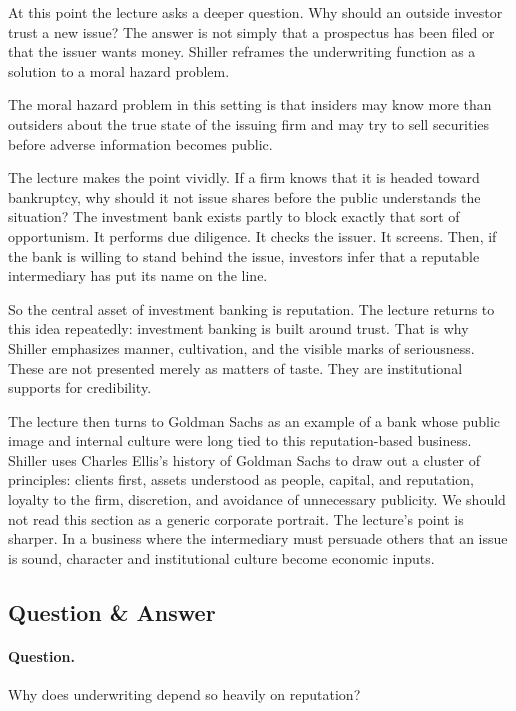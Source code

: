 At this point the lecture asks a deeper question. Why should an outside investor trust a new issue? The answer is not simply that a prospectus has been filed or that the issuer wants money. Shiller reframes the underwriting function as a solution to a moral hazard problem.

\begin{definition}
The moral hazard problem in this setting is that insiders may know more than outsiders about the true state of the issuing firm and may try to sell securities before adverse information becomes public.
\end{definition}

The lecture makes the point vividly. If a firm knows that it is headed toward bankruptcy, why should it not issue shares before the public understands the situation? The investment bank exists partly to block exactly that sort of opportunism. It performs due diligence. It checks the issuer. It screens. Then, if the bank is willing to stand behind the issue, investors infer that a reputable intermediary has put its name on the line.

So the central asset of investment banking is reputation. The lecture returns to this idea repeatedly: investment banking is built around trust. That is why Shiller emphasizes manner, cultivation, and the visible marks of seriousness. These are not presented merely as matters of taste. They are institutional supports for credibility.

The lecture then turns to Goldman Sachs as an example of a bank whose public image and internal culture were long tied to this reputation-based business. Shiller uses Charles Ellis's history of Goldman Sachs to draw out a cluster of principles: clients first, assets understood as people, capital, and reputation, loyalty to the firm, discretion, and avoidance of unnecessary publicity. We should not read this section as a generic corporate portrait. The lecture's point is sharper. In a business where the intermediary must persuade others that an issue is sound, character and institutional culture become economic inputs.

\subsection{Question \& Answer}

\paragraph{Question.} Why does underwriting depend so heavily on reputation?

